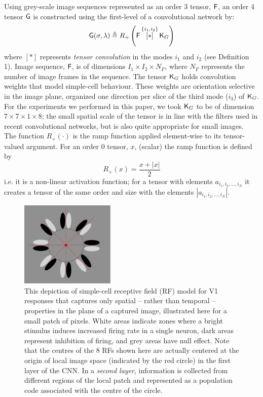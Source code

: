 Using grey-scale image sequences represented as an order 3 tensor, $\mathsf{F}$, an order 4 tensor $\mathsf{G}$ is constructed using the first-level of a convolutional network by:
\begin{equation}
\mathsf{G}(\sigma,\lambda) \triangleq R_+ \left ( \mathsf{F} \, \overset{\lbrace i_1,i_2\rbrace}{[ \ast ]}\, {\mathsf{K}_{G}} \right )
\end{equation}
where $[ \ast ]$ represents {\it tensor convolution} in the modes $i_1$ and $i_2$ (see Definition 1). Image sequence, $\mathsf{F}$, is of dimensions $I_1\times I_2 \times N_F$, where $N_F$ represents the number of image frames in the sequence. The tensor $\mathsf{K}_{G}$ holds convolution weights that model simple-cell behaviour. These weights are orientation selective in the image plane, organized one direction per slice of the third mode ($i_3$) of $\mathsf{K}_{G}$. For the experiments we performed in this paper, we took $\mathsf{K}_{G}$ to be of dimension $7 \times 7 \times 1\times 8$; the small spatial scale of the tensor is in line with the filters used in recent convolutional networks, but is also quite appropriate for small images.   \\

The function $R_+(\cdot)$ is the ramp function applied element-wise to its tensor-valued argument. For an order 0 tensor, $x$, (scalar) the ramp function is defined by
\[
R_+(x) = \frac{x + |x|}{2}
\]
i.e. it is a non-linear activation function; for a tensor with elements $a_{i_1,i_2,...,i_N}$ it creates a tensor of the same order and size with the elements $|a_{i_1,i_2,...,i_N}|$. \\

\begin{figure}
\begin{center}
\includegraphics[width=4.5cm]{gfx/Chapter05/OrientedGabors.pdf}
\caption{This depiction of simple-cell receptive field (RF) model for V1 responses that captures only spatial -- rather than temporal -- properties in the plane of a captured image, illustrated here for a small patch of pixels. White areas indicate zones where a bright stimulus induces increased firing rate in a single neuron, dark areas represent inhibition of firing, and grey areas have null effect.  Note that the centres of the 8 RFs shown here are actually centered at the origin of local image space (indicated by the red circle) in the first layer of the CNN.  In a {\em second layer}, information is collected from different regions of the local patch and represented as a population code associated with the centre of the circle.}
\label{fig:OG}
\end{center}
\end{figure}

